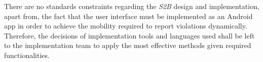 There are no standards constraints regarding the \emph{S2B} design and implementation, apart from, the fact that the user interface must be implemented as an Android app in order to achieve the mobility required to report violations dynamically. Therefore, the decisions of implementation tools and languages used shall be left to the implementation team to apply the most effective methods given required functionalities. 